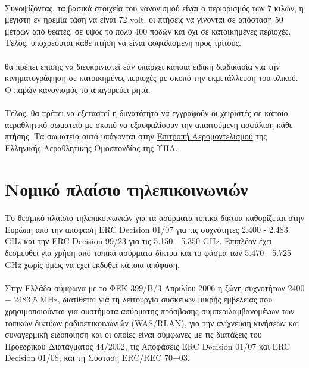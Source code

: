 \documentclass[a4paper, 12pt, twoside]{report}
\begin{document}
{{{{{{			\paragraph{}{Συνοψίζοντας, τα βασικά στοιχεία του κανονισμού είναι ο περιορισμός των 7 κιλών, η μέγιστη εν ηρεμία τάση να είναι 72 volt, οι πτήσεις να γίνονται σε απόσταση 50 μέτρων από θεατές, σε ύψος το πολύ 400 ποδών και όχι σε κατοικημένες περιοχές. Τέλος, υποχρεούται κάθε πτήση να είναι ασφαλισμένη προς τρίτους.
			}
			\paragraph{}{θα πρέπει επίσης να διευκρινιστεί εάν υπάρχει κάποια ειδική διαδικασία για την κινηματογράφηση σε κατοικημένες περιοχές με σκοπό την εκμετάλλευση του υλικού. Ο παρών κανονισμός το απαγορεύει ρητά.
			}
			\paragraph{}{Τέλος, θα πρέπει να εξεταστεί η δυνατότητα να εγγραφούν οι χειριστές σε κάποιο αεραθλητικό σωματείο με σκοπό να εξασφαλίσουν την απαιτούμενη ασφάλιση κάθε πτήσης. Τα σωματεία αυτά υπάγονται στην \href{http://epae.elao.gr/}{Επιτροπή Αερομοντελισμού} της \href{http://www.elao.gr/web/index.html}{Ελληνικής Αεραθλητικής Ομοσπονδίας} της ΥΠΑ.
			}			
			
			
		\section{Νομικό πλαίσιο τηλεπικοινωνιών}
			
			\paragraph{}{Το θεσμικό πλαίσιο τηλεπικοινωνιών για τα ασύρματα τοπικά δίκτυα καθορίζεται στην Ευρώπη από την απόφαση ERC Decision 01/07 για τις συχνότητες 2.400 - 2.483 GHz και την ERC Decision 99/23 για τις 5.150 - 5.350 GHz. Επιπλέον έχει δεσμευθεί για χρήση από τοπικά ασύρματα δίκτυα και το φάσμα των 5.470 - 5.725 GHz χωρίς όμως να έχει εκδοθεί κάποια απόφαση.
			}
			\paragraph{}{Στην Ελλάδα σύμφωνα με το ΦΕΚ 399/Β/3 Απριλίου 2006 η ζώνη συχνοτήτων 2400 − 2483,5 MHz, διατίθεται για τη λειτουργία συσκευών μικρής εμβέλειας που χρησιμοποιούνται για συστήματα ασύρματης πρόσβασης συμπεριλαμβανομένων των τοπικών δικτύων ραδιοεπικοινωνιών (WAS/RLAN), για την ανίχνευση κινήσεων και συναγερμική ειδοποίηση και οι οποίες είναι σύμφωνες με τις διατάξεις του Προεδρικού Διατάγματος 44/2002, τις Αποφάσεις  ERC Decision 01/07 και  ERC Decision 01/08, και τη Σύσταση ERC/REC 70−03.
			}
}}}}}}
\end{document}
